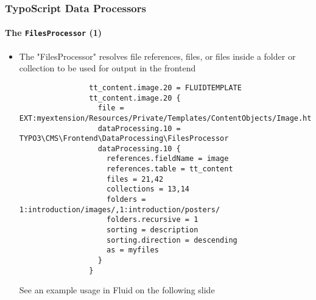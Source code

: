 
\begin{frame}[fragile]
	\frametitle{TypoScript Data Processors}
	\framesubtitle{The \texttt{FilesProcessor} (1)}

	\lstset{basicstyle=\tiny\ttfamily}

	\begin{itemize}

		\item The "FilesProcessor" resolves file references, files, or files inside a folder or collection
			to be used for output in the frontend

			\begin{lstlisting}
				tt_content.image.20 = FLUIDTEMPLATE
				tt_content.image.20 {
				  file = EXT:myextension/Resources/Private/Templates/ContentObjects/Image.html
				  dataProcessing.10 = TYPO3\CMS\Frontend\DataProcessing\FilesProcessor
				  dataProcessing.10 {
				    references.fieldName = image
				    references.table = tt_content
				    files = 21,42
				    collections = 13,14
				    folders = 1:introduction/images/,1:introduction/posters/
				    folders.recursive = 1
				    sorting = description
				    sorting.direction = descending
				    as = myfiles
				  }
				}
			\end{lstlisting}

			\small
				See an example usage in Fluid on the following slide
			\normalsize

	\end{itemize}

\end{frame}


